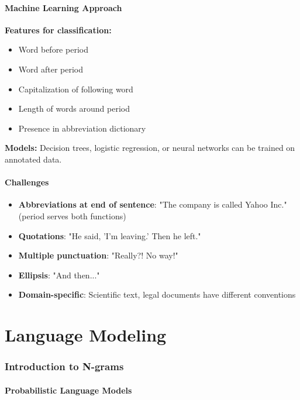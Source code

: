 \documentclass[11pt,a4paper]{article}
\theoremstyle{definition}
\theoremstyle{plain}
\theoremstyle{remark}
\begin{document}
\subsection{Machine Learning Approach}

\textbf{Features for classification:}
\begin{itemize}
    \item Word before period
    \item Word after period
    \item Capitalization of following word
    \item Length of words around period
    \item Presence in abbreviation dictionary
\end{itemize}

\textbf{Models:} Decision trees, logistic regression, or neural networks can be trained on annotated data.

\subsection{Challenges}

\begin{itemize}
    \item \textbf{Abbreviations at end of sentence}: "The company is called Yahoo Inc." (period serves both functions)
    \item \textbf{Quotations}: "He said, 'I'm leaving.' Then he left."
    \item \textbf{Multiple punctuation}: "Really?! No way!"
    \item \textbf{Ellipsis}: "And then..."
    \item \textbf{Domain-specific}: Scientific text, legal documents have different conventions
\end{itemize}



\newpage

\part{Language Modeling}

\section{Introduction to N-grams}

\subsection{Probabilistic Language Models}
\end{document}
